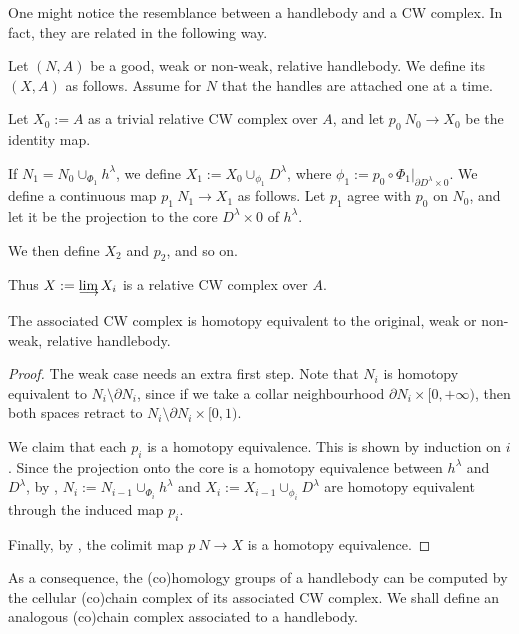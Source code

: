 One might notice the resemblance between a handlebody and a CW complex.
In fact, they are related in the following way.

\begin{definition}
Let $(N,A)$ be a good, weak or non-weak, relative handlebody.
We define its  $(X,A)$ as follows.
Assume for $N$ that the handles are attached one at a time.
\begin{itms}
\item Let $X_0:=A$ as a trivial relative CW complex over $A$,
and let $p_0\:N_0\to X_0$ be the identity map.
\item If $N_1=N_0\cup_{\Phi_1}h^\lambda$,
we define $X_1:=X_0\cup_{\phi_1}D^\lambda$,
where $\phi_1:=p_0\circ\Phi_1|_{\partial D^\lambda\times 0}$.
We define a continuous map $p_1\:N_1\to X_1$ as follows.
Let $p_1$ agree with $p_0$ on $N_0$,
and let it be the projection to the core $D^\lambda\times0$ of $h^\lambda$.
\item We then define $X_2$ and $p_2$, and so on. 
\end{itms}
Thus $X:=\limdct X_i$ is a relative CW complex over $A$.
\end{definition}

\begin{proposition}\label{prop:ass-cw}
The associated CW complex is homotopy equivalent to the original, weak or non-weak, relative handlebody.
\end{proposition}

\begin{proof}
The weak case needs an extra first step. Note that $N_i$ is homotopy equivalent to $N_i\setminus\partial N_i$,
since if we take a collar neighbourhood $\partial N_i\times[0,+\infty)$,
then both spaces retract to $N_i\setminus\partial N_i\times[0,1)$.

We claim that each $p_i$ is a homotopy equivalence.
This is shown by induction on $i$. Since the projection onto the core is a homotopy equivalence
between $h^\lambda$ and $D^\lambda$, by \cite[Lemma~2.1.3]{may},
$N_i:=N_{i-1}\cup_{\Phi_i}h^\lambda$ and $X_i:=X_{i-1}\cup_{\phi_i}D^\lambda$
are homotopy equivalent through the induced map $p_i$.

Finally, by \cite[Lemma~2.1.10]{may}, the colimit map $p\:N\to X$ is a homotopy equivalence.
\end{proof}

As a consequence,
the (co)homology groups of a handlebody 
can be computed by the cellular (co)chain complex of 
its associated CW complex.
We shall define an analogous (co)chain complex associated to a handlebody.

